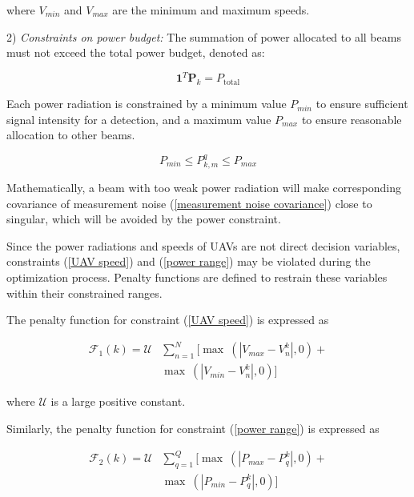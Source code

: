 \documentclass[12pt,journal,draftclsnofoot,onecolumn]{IEEEtran}
\begin{document}
where $V_{min}$ and $V_{max}$ are the minimum and maximum speeds.

2) \emph{Constraints on power budget:} The summation of power allocated to all beams must not exceed the total power budget, denoted as:

\begin{equation}
	{{\mathbf 1}^T}{{\mathbf P}_k}={P_{\text{total}}}
	\label{total power budget}
\end{equation}

Each power radiation is constrained by a minimum value $P_{min}$ to ensure sufficient signal intensity for a detection, and a maximum value $P_{max}$ to ensure reasonable allocation to other beams.

\begin{equation}
	P_{min}\leq P_{k,m}^q\leq P_{max}
	\label{power range}
\end{equation}

Mathematically, a beam with too weak power radiation will make corresponding covariance of measurement noise (\ref{measurement noise covariance}) close to singular, which will be avoided by the power constraint.

Since the power radiations and speeds of UAVs are not direct decision variables, constraints (\ref{UAV speed}) and (\ref{power range}) may be violated during the optimization process. Penalty functions are defined to restrain these variables within their constrained ranges.

The penalty function for constraint (\ref{UAV speed}) is expressed as

\begin{equation}
	\begin{aligned}
		\mathcal{F}_1(k) = \mathcal{U}&\sum_{n=1}^{N}[\max\ (|V_{max}-V_n^k|,0)+\\
		&\max\ (|V_{min}-V_n^k|,0)]
	\end{aligned}	
\end{equation}

where $\mathcal{U}$ is a large positive constant.

Similarly, the penalty function for constraint (\ref{power range}) is expressed as

\begin{equation}
	\begin{aligned}
		\mathcal{F}_2(k) = \mathcal{U}&\sum_{q=1}^{Q}[\max\ (|P_{max}-P_q^k|,0)+\\
		&\max\ (|P_{min}-P_q^k|,0)]
	\end{aligned}	
\end{equation}
\end{document}
